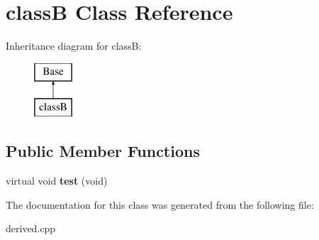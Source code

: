 \hypertarget{classclass_b}{\section{class\+B Class Reference}
\label{classclass_b}
}
Inheritance diagram for class\+B\+:\begin{figure}[H]
\begin{center}
\leavevmode
\includegraphics[height=2.000000cm]{classclass_b}
\end{center}
\end{figure}
\subsection*{Public Member Functions}
\begin{DoxyCompactItemize}
\item 
\hypertarget{classclass_b_a27b67a93372ffc6ec0d9fbe01768ab05}{virtual void {\bfseries test} (void)}\label{classclass_b_a27b67a93372ffc6ec0d9fbe01768ab05}

\end{DoxyCompactItemize}


The documentation for this class was generated from the following file\+:\begin{DoxyCompactItemize}
\item 
derived.\+cpp\end{DoxyCompactItemize}
